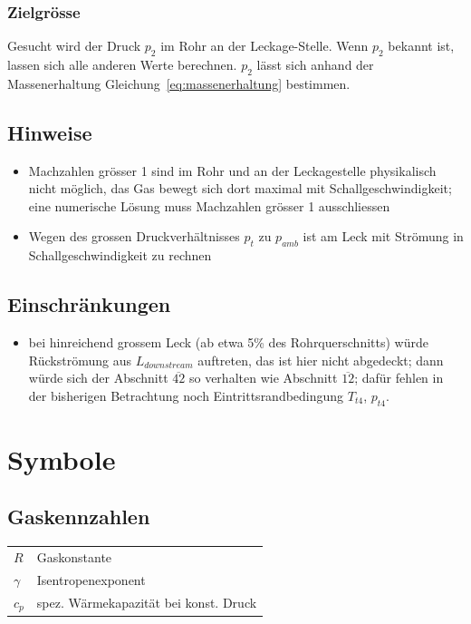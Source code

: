 \documentclass[a4paper,10pt,twocolumn]{article}
\begin{document}
\subsubsection{Zielgrösse}

Gesucht wird der Druck $p_2$ im Rohr an der Leckage-Stelle. Wenn $p_2$ bekannt ist, lassen sich alle anderen Werte berechnen. $p_2$ lässt sich anhand der Massenerhaltung Gleichung~\ref{eq:massenerhaltung} bestimmen.


\subsection{Hinweise}

\begin{itemize}
\item Machzahlen grösser 1 sind im Rohr und an der Leckagestelle physikalisch nicht möglich, das Gas bewegt sich dort maximal mit Schallgeschwindigkeit; eine numerische Lösung muss Machzahlen grösser 1 ausschliessen
\item Wegen des grossen Druckverhältnisses $p_t$ zu $p_\mathit{amb}$ ist am Leck mit Strömung in Schallgeschwindigkeit zu rechnen
\end{itemize}

\subsection{Einschränkungen}

\begin{itemize}
\item bei hinreichend grossem Leck (ab etwa 5\% des Rohrquerschnitts) würde Rückströmung aus $L_\mathit{downstream}$ auftreten, das ist hier nicht abgedeckt; dann würde sich der Abschnitt $\overline{42}$ so verhalten wie Abschnitt $\overline{12}$; dafür fehlen in der bisherigen Betrachtung noch Eintrittsrandbedingung $T_{t4}$, $p_{t4}$.
\end{itemize}


\appendix

\section{Symbole}

\subsection{Gaskennzahlen}

\begin{tabular}{ l l }
 $R$ & Gaskonstante  \\ 
 $\gamma$ & Isentropenexponent \\  
 $c_p$ & spez. Wärmekapazität bei konst. Druck \\
\end{tabular}
\end{document}
